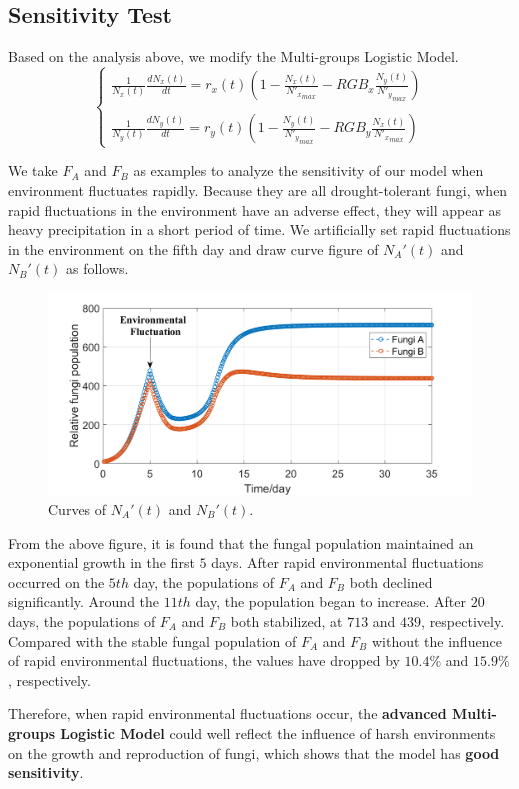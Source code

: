 \subsection{Sensitivity Test}
Based on the analysis above, we modify the Multi-groups Logistic Model.
\begin{equation}
  \begin{cases}
    \frac{1}{N_x(t)}\frac{dN_x(t)}{dt} = r_x(t)(1-\frac{N_x(t)}{{{N'}_x}_{max}} - RGB_x\frac{N_y(t)}{{{N'}_y}_{max}}) \\ \\
    \frac{1}{N_y(t)}\frac{dN_y(t)}{dt} = r_y(t)(1-\frac{N_y(t)}{{{N'}_y}_{max}} - RGB_y\frac{N_x(t)}{{{N'}_x}_{max}})
  \end{cases}
\end{equation}
\par
We take $F_A$ and $F_B$ as examples to analyze the sensitivity of our model when environment fluctuates rapidly. Because they are all drought-tolerant fungi, when rapid fluctuations in the environment have an adverse effect, they will appear as heavy precipitation in a short period of time. We artificially set rapid fluctuations in the environment on the fifth day and draw curve figure of $N_A'(t)$ and $N_B'(t)$ as follows.
\begin{figure}[H]
  \centering
  \includegraphics[width=\textwidth]{figures/A&B_sen.png}
  \caption{Curves of $N_A'(t)$ and $N_B'(t)$.}
\end{figure}
\par
From the above figure, it is found that the fungal population maintained an exponential growth in the first $5$ days. After rapid environmental fluctuations occurred on the $5th$ day, the populations of $F_A$ and $F_B$ both declined significantly. Around the $11th$ day, the population began to increase. After $20$ days, the populations of $F_A$ and $F_B$ both stabilized, at $713$ and $439$, respectively. Compared with the stable fungal population of $F_A$ and $F_B$ without the influence of rapid environmental fluctuations, the values have dropped by $10.4\%$ and $15.9\%$, respectively.
\par
Therefore, when rapid environmental fluctuations occur, the \textbf{advanced Multi-groups Logistic Model} could well reflect the influence of harsh environments on the growth and reproduction of fungi, which shows that the model has \textbf{good sensitivity}.